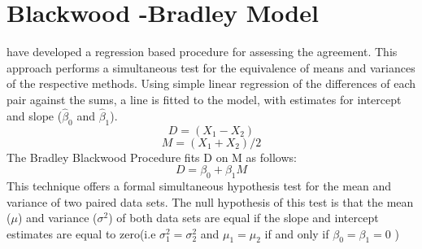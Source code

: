\documentclass[12pt, a4paper]{report}
\theoremstyle{plain}
\theoremstyle{definition}
\theoremstyle{remark}
\begin{document}
	



	\section{Blackwood -Bradley Model} 
	
	\citet{BB89} have developed a regression based procedure for
	assessing the agreement. This approach performs a simultaneous test for the equivalence of
	means and variances of the respective methods. Using simple linear
	regression of the differences of each pair against the sums, a
	line is fitted to the model, with estimates for intercept and
	slope ($\hat{\beta}_{0}$ and $\hat{\beta}_{1}$).
	\begin{equation}
		D = (X_{1}-X_{2})
	\end{equation}
	\begin{equation}
		M = (X_{1} + X_{2}) /2
	\end{equation}
	The Bradley Blackwood Procedure fits D on M as follows:\\
	\begin{equation}
		D = \beta_{0} + \beta_{1}M
	\end{equation}
	This technique offers a formal simultaneous hypothesis test for the
	mean and variance of two paired data sets.  The null
	hypothesis of this test is that the mean ($\mu$) and variance
	($\sigma^{2}$) of both data sets are equal if the slope and
	intercept estimates are equal to zero(i.e $\sigma^{2}_{1} =
	\sigma^{2}_{2}$ and $\mu_{1}=\mu_{2}$ if and only if $\beta_{0}=
	\beta_{1}=0$ )
	
\end{document}
